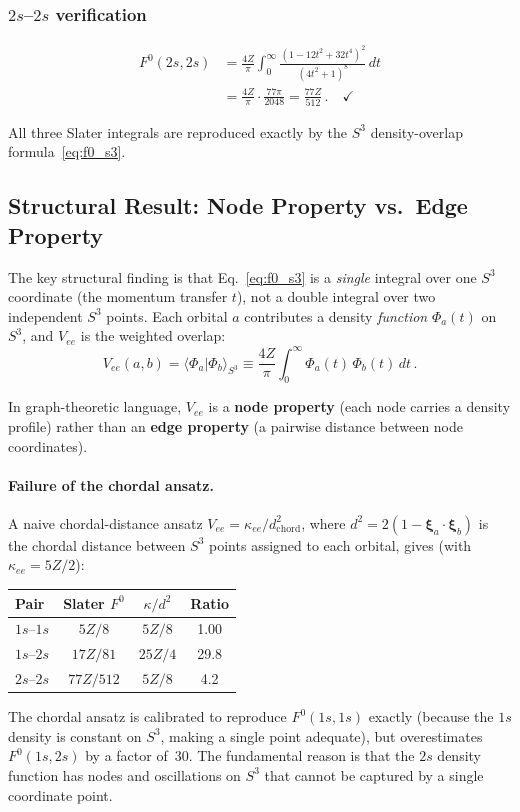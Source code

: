 \subsubsection{$2s$--$2s$ verification}

\begin{align}
  F^0(2s,2s) &= \frac{4Z}{\pi} \int_0^\infty
  \frac{(1 - 12t^2 + 32t^4)^2}{(4t^2+1)^8} \, dt \nonumber\\
  &= \frac{4Z}{\pi} \cdot \frac{77\pi}{2048}
  = \frac{77Z}{512} \,. \quad\checkmark
\end{align}

All three Slater integrals are reproduced exactly by the $S^3$
density-overlap formula~\eqref{eq:f0_s3}.

\subsection{Structural Result: Node Property vs.\ Edge Property}
\label{sec:node_vs_edge}

The key structural finding is that
Eq.~\eqref{eq:f0_s3} is a \emph{single} integral over one $S^3$
coordinate (the momentum transfer $t$), not a double integral over
two independent $S^3$ points. Each orbital $a$ contributes a density
\emph{function} $\Phi_a(t)$ on $S^3$, and $V_{ee}$ is the weighted
overlap:
\begin{equation}
  V_{ee}(a,b) = \langle \Phi_a | \Phi_b \rangle_{S^3}
  \equiv \frac{4Z}{\pi} \int_0^\infty \Phi_a(t) \, \Phi_b(t) \, dt \,.
\end{equation}

In graph-theoretic language, $V_{ee}$ is a \textbf{node property}
(each node carries a density profile) rather than an \textbf{edge
property} (a pairwise distance between node coordinates).

\paragraph{Failure of the chordal ansatz.}
A naive chordal-distance ansatz $V_{ee} = \kappa_{ee}/d^2_{\text{chord}}$,
where $d^2 = 2(1 - \boldsymbol{\xi}_a \cdot \boldsymbol{\xi}_b)$
is the chordal distance between $S^3$ points assigned to each orbital,
gives (with $\kappa_{ee} = 5Z/2$):
\begin{center}
\begin{tabular}{lccc}
\hline
Pair & Slater $F^0$ & $\kappa/d^2$ & Ratio \\
\hline
$1s$--$1s$ & $5Z/8$ & $5Z/8$ & 1.00 \\
$1s$--$2s$ & $17Z/81$ & $25Z/4$ & 29.8 \\
$2s$--$2s$ & $77Z/512$ & $5Z/8$ & 4.2 \\
\hline
\end{tabular}
\end{center}
The chordal ansatz is calibrated to reproduce $F^0(1s,1s)$ exactly
(because the $1s$ density is constant on $S^3$, making a single point
adequate), but overestimates $F^0(1s,2s)$ by a factor of~30.
The fundamental reason is that the $2s$ density function has nodes
and oscillations on $S^3$ that cannot be captured by a single coordinate
point.

